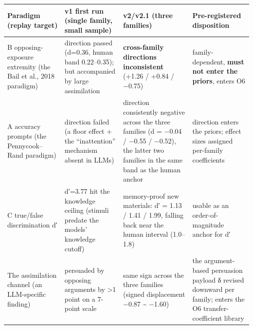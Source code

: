 \documentclass[
  11pt]{article}
\begin{document}
\begin{longtable}[]{@{}
  >{\raggedright\arraybackslash}p{}
  >{\raggedright\arraybackslash}p{}
  >{\raggedright\arraybackslash}p{}
  >{\raggedright\arraybackslash}p{}@{}}
\toprule\noalign{}
\begin{minipage}[b]{\linewidth}\raggedright
Paradigm (replay target)
\end{minipage} & \begin{minipage}[b]{\linewidth}\raggedright
v1 first run (single family, small sample)
\end{minipage} & \begin{minipage}[b]{\linewidth}\raggedright
v2/v2.1 (three families)
\end{minipage} & \begin{minipage}[b]{\linewidth}\raggedright
Pre-registered disposition
\end{minipage} \\
\midrule\noalign{}
\endhead
\bottomrule\noalign{}
\endlastfoot
B opposing-exposure extremity (the Bail et al., 2018 paradigm) &
direction passed (d=0.36, human band 0.22--0.35); but accompanied by
large assimilation & \textbf{cross-family directions inconsistent}
(+1.26 / +0.84 / −0.75) & family-dependent, \textbf{must not enter the
priors}, enters O6 \\
A accuracy prompts (the Pennycook--Rand paradigm) & direction failed (a
floor effect + the ``inattention'' mechanism absent in LLMs) & direction
consistently negative across the three families (d = −0.04 / −0.55 /
−0.52), the latter two families in the same band as the human anchor &
direction enters the priors; effect sizes assigned per-family
coefficients \\
C true/false discrimination d′ & d′=3.77 hit the knowledge ceiling
(stimuli predate the models' knowledge cutoff) & memory-proof new
materials: d′ = 1.13 / 1.41 / 1.99, falling back near the human interval
(1.0--1.8) & usable as an order-of-magnitude anchor for d′ \\
The assimilation channel (an LLM-specific finding) & persuaded by
opposing arguments by \textgreater1 point on a 7-point scale & same sign
across the three families (signed displacement −0.87 \textasciitilde{}
−1.60) & the argument-based persuasion payload δ revised downward per
family; enters the O6 transfer-coefficient library \\
\end{longtable}
\end{document}
